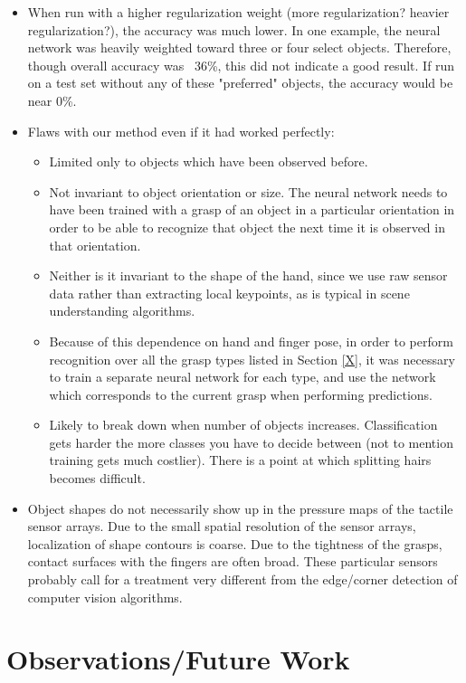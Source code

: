 \documentclass[12pt, oneside]{article}
\begin{document}
\begin{itemize}
\item When run with a higher regularization weight (more regularization? heavier regularization?), the accuracy was much lower. In one example, the neural network was heavily weighted toward three or four select objects. Therefore, though overall accuracy was ~36\%, this did not indicate a good result. If run on a test set without any of these "preferred" objects, the accuracy would be near 0\%.
\item Flaws with our method even if it had worked perfectly:
\begin{itemize}
\item Limited only to objects which have been observed before.
\item Not invariant to object orientation or size. The neural network needs to have been trained with a grasp of an object in a particular orientation in order to be able to recognize that object the next time it is observed in that orientation.
\item Neither is it invariant to the shape of the hand, since we use raw sensor data rather than extracting local keypoints, as is typical in scene understanding algorithms.
\item Because of this dependence on hand and finger pose, in order to perform recognition over all the grasp types listed in Section \ref{X}, it was necessary to train a separate neural network for each type, and use the network which corresponds to the current grasp when performing predictions.
\item Likely to break down when number of objects increases. Classification gets harder the more classes you have to decide between (not to mention training gets much costlier). There is a point at which splitting hairs becomes difficult.
\end{itemize}
\item Object shapes do not necessarily show up in the pressure maps of the tactile sensor arrays. Due to the small spatial resolution of the sensor arrays, localization of shape contours is coarse. Due to the tightness of the grasps, contact surfaces with the fingers are often broad. These particular sensors probably call for a treatment very different from the edge/corner detection of computer vision algorithms.

\end{itemize}

\section{Observations/Future Work}
\end{document}
